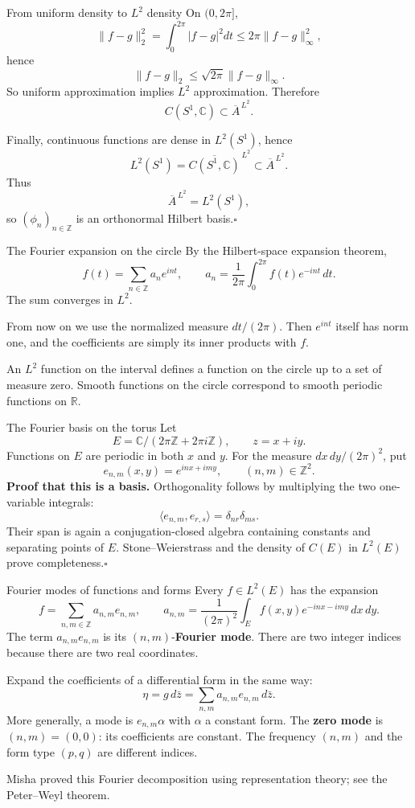 \documentclass[aspectratio=169,11pt]{beamer}
\newcommand{\C}{\mathbb C}
\newcommand{\R}{\mathbb R}
\newcommand{\Z}{\mathbb Z}
\newcommand{\ee}{e_{n,m}}
\begin{document}
\begin{frame}{From uniform density to $L^2$ density}
On $(0,2\pi]$,
\[
 \|f-g\|_2^2
 =\int_0^{2\pi}|f-g|^2dt
 \leq 2\pi\|f-g\|_\infty^2,
\]
hence
\[
 \|f-g\|_2\leq\sqrt{2\pi}\|f-g\|_\infty.
\]
So uniform approximation implies $L^2$ approximation. Therefore
\[
 C(S^1,\C)\subset\overline A^{\,L^2}.
\]

Finally, continuous functions are dense in $L^2(S^1)$, hence
\[
 L^2(S^1)=\overline{C(S^1,\C)}^{\,L^2}
 \subset\overline A^{\,L^2}.
\]
Thus
\[
 \boxed{\overline A^{\,L^2}=L^2(S^1),}
\]
so $(\phi_n)_{n\in\Z}$ is an orthonormal Hilbert basis.\hfill$\square$
\end{frame}

\begin{frame}{The Fourier expansion on the circle}
By the Hilbert-space expansion theorem,
\[
 f(t)=\sum_{n\in\Z}a_n e^{int},\qquad
 a_n=\frac1{2\pi}\int_0^{2\pi}f(t)e^{-int}\,dt.
\]
The sum converges in $L^2$.

From now on we use the normalized measure $dt/(2\pi)$.
Then $e^{int}$ itself has norm one, and the coefficients are simply
its inner products with $f$.

An $L^2$ function on the interval defines a function on the circle
up to a set of measure zero. Smooth functions on the circle correspond
to smooth periodic functions on $\R$.
\end{frame}

\begin{frame}{The Fourier basis on the torus}
Let
\[
 E=\C/(2\pi\Z+2\pi i\Z),\qquad z=x+iy.
\]
Functions on $E$ are periodic in both $x$ and $y$.
For the measure $dx\,dy/(2\pi)^2$, put
\[
 \ee(x,y)=e^{inx+imy},\qquad(n,m)\in\Z^2.
\]
\textbf{Proof that this is a basis.} Orthogonality follows by multiplying
the two one-variable integrals:
\[
 \langle e_{n,m},e_{r,s}\rangle=\delta_{nr}\delta_{ms}.
\]
Their span is again a conjugation-closed algebra containing constants
and separating points of $E$. Stone--Weierstrass and the density of
$C(E)$ in $L^2(E)$ prove completeness.\hfill$\square$
\end{frame}

\begin{frame}{Fourier modes of functions and forms}
Every $f\in L^2(E)$ has the expansion
\[
 f=\sum_{n,m\in\Z}a_{n,m}\ee,\qquad
 a_{n,m}=\frac1{(2\pi)^2}\int_E f(x,y)e^{-inx-imy}\,dx\,dy.
\]
The term $a_{n,m}\ee$ is its $(n,m)$-\textbf{Fourier mode}.
There are two integer indices because there are two real coordinates.

Expand the coefficients of a differential form in the same way:
\[
 \eta=g\,d\bar z=\sum_{n,m}a_{n,m}\ee\,d\bar z.
\]
More generally, a mode is $\ee\alpha$ with $\alpha$ a constant form.
The \textbf{zero mode} is $(n,m)=(0,0)$: its coefficients are constant.
The frequency $(n,m)$ and the form type $(p,q)$ are different indices.

{\small Misha proved this Fourier decomposition using representation theory;
see the Peter--Weyl theorem.}
\end{frame}
\end{document}

